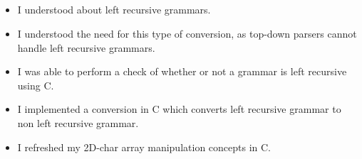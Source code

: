 \documentclass[12pt, a4]{article}
\begin{document}
\newpage
\subsection*{}
\begin{itemize}

\item I understood about left recursive grammars.
\item I understood the need for this type of conversion, as top-down parsers cannot handle left recursive grammars.
\item I was able to perform a check of whether or not a grammar is left recursive using C.
\item I implemented a conversion in C which converts left recursive grammar to non left recursive grammar.
\item I refreshed my 2D-char array manipulation concepts in C.

\end{itemize}
\end{document}
